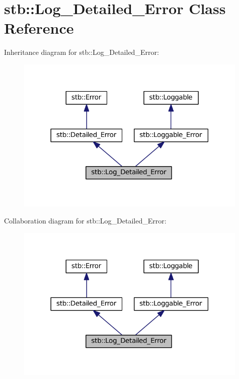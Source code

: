 \hypertarget{classstb_1_1Log__Detailed__Error}{\section{stb\+:\+:Log\+\_\+\+Detailed\+\_\+\+Error Class Reference}
\label{classstb_1_1Log__Detailed__Error}
}


Inheritance diagram for stb\+:\+:Log\+\_\+\+Detailed\+\_\+\+Error\+:
\nopagebreak
\begin{figure}[H]
\begin{center}
\leavevmode
\includegraphics[width=314pt]{classstb_1_1Log__Detailed__Error__inherit__graph}
\end{center}
\end{figure}


Collaboration diagram for stb\+:\+:Log\+\_\+\+Detailed\+\_\+\+Error\+:
\nopagebreak
\begin{figure}[H]
\begin{center}
\leavevmode
\includegraphics[width=314pt]{classstb_1_1Log__Detailed__Error__coll__graph}
\end{center}
\end{figure}
